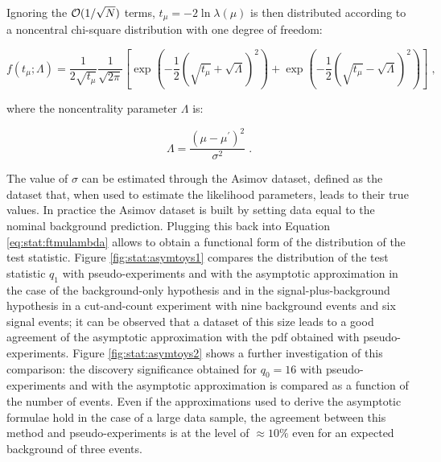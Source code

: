 \noindent Ignoring the ${\cal  O}(1/\sqrt{N})$ terms, $t_{\mu} = -2 \ln \lambda(\mu)$ is then distributed according to a noncentral chi-square distribution with one degree of freedom:

\begin{equation}
\label{eq:stat:ftmulambda}
f(t_{\mu};\Lambda) = \frac{1}{2 \sqrt{t_{\mu}}} \frac{1}{\sqrt{2 \pi}}
\left[ \exp \left( - \frac{1}{2}
\left( \sqrt{t_{\mu}} + \sqrt{\Lambda} \right)^2 \right) +
\exp \left( - \frac{1}{2} \left( \sqrt{t_{\mu}} - \sqrt{\Lambda} \right)^2
\right) \right] \;,
\end{equation}

\noindent where the noncentrality parameter $\Lambda$ is:

\begin{equation}
\label{eq:stat:noncentrality}
\Lambda = \frac{(\mu - \mu^{\prime})^2}{\sigma^2} \; .
\end{equation}

\noindent The value of $\sigma$ can be estimated through the Asimov dataset, defined as the dataset that, when used to estimate the likelihood parameters, leads to their true values. 
In practice the Asimov dataset is built by setting data equal to the nominal background prediction. 
Plugging this back into Equation \ref{eq:stat:ftmulambda} allows to obtain a functional form of the distribution of the test statistic. Figure \ref{fig:stat:asymtoys1} compares the distribution of the test statistic $q_1$ with pseudo-experiments and with the asymptotic approximation in the case of the background-only hypothesis and in the signal-plus-background hypothesis
in a cut-and-count experiment with nine background events and six signal events; 
it can be observed that a dataset of this size leads to a good agreement of the asymptotic approximation with the \gls{pdf} obtained with pseudo-experiments.
Figure \ref{fig:stat:asymtoys2} shows a further investigation of this comparison: the discovery significance obtained for $q_0=16$ with pseudo-experiments and with the asymptotic approximation is compared as a function of the number of events. 
Even if the approximations used to derive the asymptotic formulae hold in the case of a large data sample, 
the agreement between this method and pseudo-experiments is at the level of $\approx 10\%$ even for an expected background of three events. 


